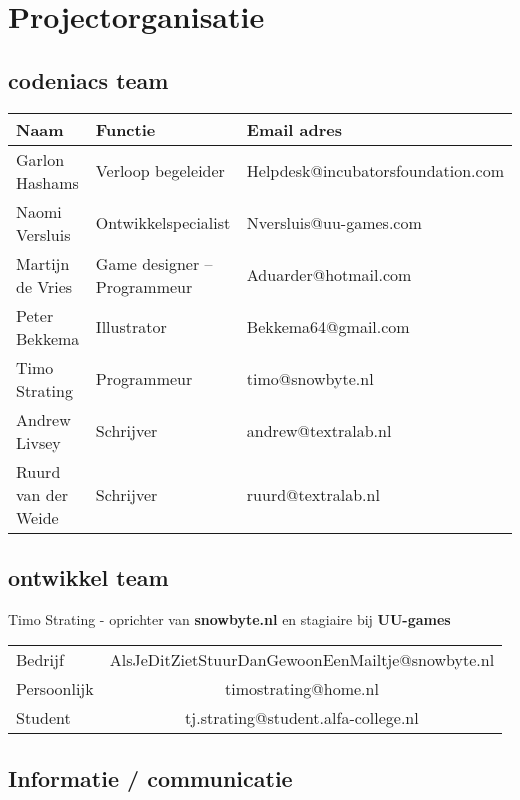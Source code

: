 \documentclass[]{report}
\begin{document}
\chapter{Projectorganisatie}

\section{codeniacs team}
\begin{tabular}{ l l l }
	\textbf{Naam} & \textbf{Functie} & \textbf{Email adres} \\ \hline
	Garlon Hashams 			& Verloop begeleider				& Helpdesk@incubatorsfoundation.com \\ 
	Naomi Versluis 			& Ontwikkelspecialist 				& Nversluis@uu-games.com \\
	Martijn de Vries 		& Game designer – Programmeur 		& Aduarder@hotmail.com \\
	Peter Bekkema			& Illustrator						& Bekkema64@gmail.com \\
	Timo Strating 			& Programmeur 						& timo@snowbyte.nl \\
	Andrew Livsey 			& Schrijver							& andrew@textralab.nl \\
	Ruurd van der Weide		& Schrijver							& ruurd@textralab.nl \\
\end{tabular}


\section{ontwikkel team}
\begin{center}
	Timo Strating - oprichter van \textbf{snowbyte.nl} en stagiaire bij \textbf{UU-games}
\end{center}	

\begin{center}
	\begin{tabular}{ l c }
		Bedrijf & AlsJeDitZietStuurDanGewoonEenMailtje@snowbyte.nl \\
		Persoonlijk & timostrating@home.nl  \\
		Student & tj.strating@student.alfa-college.nl \\
	\end{tabular}
\end{center}


\section{Informatie / communicatie}
\end{document}
